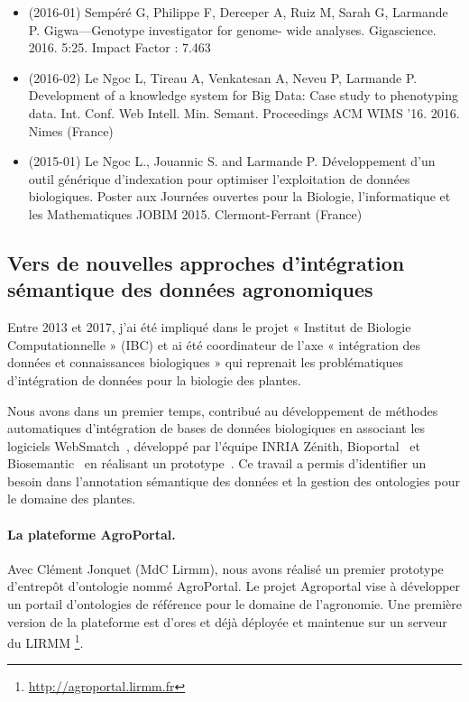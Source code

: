 \begin{itemize}
\item (2016-01) Sempéré G, Philippe F, Dereeper A, Ruiz M, Sarah G, Larmande P. Gigwa—Genotype investigator for genome- wide analyses. Gigascience. 2016. 5:25. Impact Factor : 7.463
\item (2016-02) Le Ngoc L, Tireau A, Venkatesan A, Neveu P, Larmande P. Development of a knowledge system for Big Data: Case study to phenotyping data. Int. Conf. Web Intell. Min. Semant. Proceedings ACM WIMS ’16. 2016. Nimes (France)
\item (2015-01) Le Ngoc L., Jouannic S. and Larmande P. Développement d'un outil générique d'indexation pour optimiser l'exploitation de données biologiques. Poster aux Journées ouvertes pour la Biologie, l’informatique et les Mathematiques JOBIM 2015. Clermont-Ferrant (France)
\end{itemize}


\subsection*{Vers de nouvelles approches d'intégration sémantique des données agronomiques}
\label{IBC}

Entre 2013 et 2017, j'ai été impliqué dans le projet « Institut de Biologie Computationnelle » (IBC) et ai été coordinateur de l’axe « intégration des données et connaissances biologiques » qui reprenait les problématiques d’intégration de données pour la biologie des plantes.

Nous avons dans un premier temps, contribué au développement de méthodes automatiques d’intégration de bases de données biologiques en associant les logiciels WebSmatch~\cite{Coletta2012}, développé par l’équipe INRIA Zénith, Bioportal~\cite{Noy2009,Melzi} et Biosemantic~\cite{wollbrett2013clever} en réalisant un prototype~\cite{castanier2014semantic}. Ce travail a permis d’identifier un besoin dans l’annotation sémantique des données et la gestion des ontologies pour le domaine des plantes. \\

\paragraph*{La plateforme AgroPortal.} Avec Clément Jonquet (MdC Lirmm), nous avons réalisé un premier prototype d’entrepôt d’ontologie nommé AgroPortal. Le projet Agroportal vise à développer un portail d'ontologies de référence pour le domaine de l'agronomie. Une première version de la plateforme est d’ores et déjà déployée et maintenue sur un serveur du LIRMM \footnote{\url{http://agroportal.lirmm.fr}}. 


